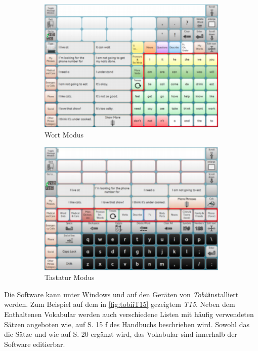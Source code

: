             \begin{figure}[H]
				\centering
				\begin{subfigure}{.45\textwidth}
  					\centering
  					\includegraphics[width=.8\linewidth]{images/sonoScribeWords.png}
  					\caption{Wort Modus \parencite[S. 13]{tobii:sonoScribeManual}}
                    \label{fig:sonoScribeWords}
                    
				\end{subfigure}
				\begin{subfigure}{.45\textwidth}
  					\centering
  					\includegraphics[width=.8\linewidth]{images/SonoScribeKeboard.png}
  					\caption{Tastatur Modus \parencite[S. 22]{tobii:sonoScribeManual}}
                    \label{fig:sonoScribeKeyboard}
				\end{subfigure}
                \caption{ }
                \label{fig:sonoScribe}
			\end{figure}
        	
            Die Software kann unter Windows und auf den Geräten von \emph{Tobii}installiert werden. Zum Beispiel auf dem in \autoref{fig:tobiiT15} gezeigtem \emph{T15}. Neben dem Enthaltenen Vokabular werden auch verschiedene Listen mit häufig verwendeten Sätzen angeboten wie, auf S. 15 f des Handbuchs beschrieben wird. Sowohl das die Sätze und wie auf S. 20 ergänzt wird, das Vokabular sind innerhalb der Software editierbar.
            
